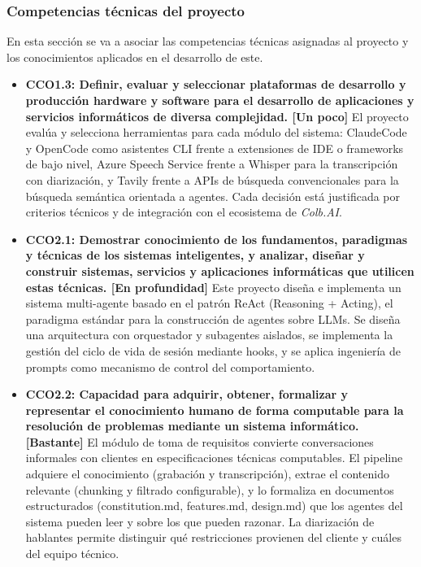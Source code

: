 \documentclass[11pt, letterpaper]{article}
\begin{document}
\subsubsection{Competencias técnicas del proyecto}
\label{sec:competencias_tecnicasa}
En esta sección se va a asociar las competencias técnicas asignadas al proyecto y los conocimientos aplicados en el desarrollo de este.
\begin{itemize}
    \item\textbf{CCO1.3: Definir, evaluar y seleccionar plataformas de desarrollo y producción hardware y software para el desarrollo de aplicaciones y servicios informáticos de diversa complejidad. [Un poco]} El proyecto evalúa y selecciona herramientas para cada módulo del sistema: ClaudeCode y OpenCode como asistentes CLI frente a extensiones de IDE o frameworks de bajo nivel, Azure Speech Service frente a Whisper para la transcripción con diarización, y Tavily frente a APIs de búsqueda convencionales para la búsqueda semántica orientada a agentes. Cada decisión está justificada por criterios técnicos y de integración con el ecosistema de \textit{Colb.AI}.
    \item\textbf{CCO2.1: Demostrar conocimiento de los fundamentos, paradigmas y técnicas de los sistemas inteligentes, y analizar, diseñar y construir sistemas, servicios y aplicaciones informáticas que utilicen estas técnicas. [En profundidad]} Este proyecto diseña e implementa un sistema multi-agente basado en el patrón ReAct (Reasoning + Acting), el paradigma estándar para la construcción de agentes sobre LLMs. Se diseña una arquitectura con orquestador y subagentes aislados, se implementa la gestión del ciclo de vida de sesión mediante hooks, y se aplica ingeniería de prompts como mecanismo de control del comportamiento.
    \item\textbf{CCO2.2: Capacidad para adquirir, obtener, formalizar y representar el conocimiento humano de forma computable para la resolución de problemas mediante un sistema informático. [Bastante]} El módulo de toma de requisitos convierte conversaciones informales con clientes en especificaciones técnicas computables. El pipeline adquiere el conocimiento (grabación y transcripción), extrae el contenido relevante (chunking y filtrado configurable), y lo formaliza en documentos estructurados (constitution.md, features.md, design.md) que los agentes del sistema pueden leer y sobre los que pueden razonar. La diarización de hablantes permite distinguir qué restricciones provienen del cliente y cuáles del equipo técnico.

\end{itemize}
\end{document}
